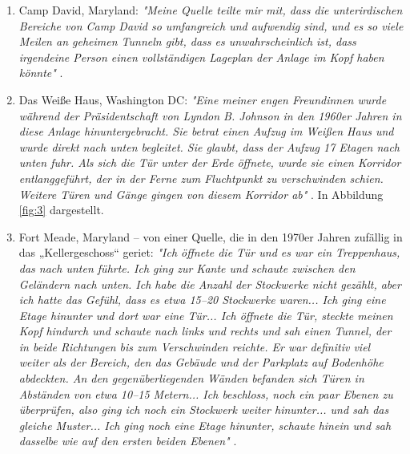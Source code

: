 \documentclass[10pt,twocolumn,letterpaper]{article}
\begin{document}
\begin{flushleft}
\begin{enumerate}
    \item Camp David, Maryland: \textit{"Meine Quelle teilte mir mit, dass die unterirdischen Bereiche von Camp David so umfangreich und aufwendig sind, und es so viele Meilen an geheimen Tunneln gibt, dass es unwahrscheinlich ist, dass irgendeine Person einen vollständigen Lageplan der Anlage im Kopf haben könnte"} \cite{22}.
    \item Das Weiße Haus, Washington DC: \textit{"Eine meiner engen Freundinnen wurde während der Präsidentschaft von Lyndon B. Johnson in den 1960er Jahren in diese Anlage hinuntergebracht. Sie betrat einen Aufzug im Weißen Haus und wurde direkt nach unten begleitet. Sie glaubt, dass der Aufzug 17 Etagen nach unten fuhr. Als sich die Tür unter der Erde öffnete, wurde sie einen Korridor entlanggeführt, der in der Ferne zum Fluchtpunkt zu verschwinden schien. Weitere Türen und Gänge gingen von diesem Korridor ab"} \cite{22}. In Abbildung \ref{fig:3} dargestellt.
    \item Fort Meade, Maryland – von einer Quelle, die in den 1970er Jahren zufällig in das „Kellergeschoss“ geriet: \textit{"Ich öffnete die Tür und es war ein Treppenhaus, das nach unten führte. Ich ging zur Kante und schaute zwischen den Geländern nach unten. Ich habe die Anzahl der Stockwerke nicht gezählt, aber ich hatte das Gefühl, dass es etwa 15–20 Stockwerke waren... Ich ging eine Etage hinunter und dort war eine Tür... Ich öffnete die Tür, steckte meinen Kopf hindurch und schaute nach links und rechts und sah einen Tunnel, der in beide Richtungen bis zum Verschwinden reichte. Er war definitiv viel weiter als der Bereich, den das Gebäude und der Parkplatz auf Bodenhöhe abdeckten. An den gegenüberliegenden Wänden befanden sich Türen in Abständen von etwa 10–15 Metern... Ich beschloss, noch ein paar Ebenen zu überprüfen, also ging ich noch ein Stockwerk weiter hinunter... und sah das gleiche Muster... Ich ging noch eine Etage hinunter, schaute hinein und sah dasselbe wie auf den ersten beiden Ebenen"} \cite{22}.
\end{enumerate}
\end{flushleft}
\end{document}
